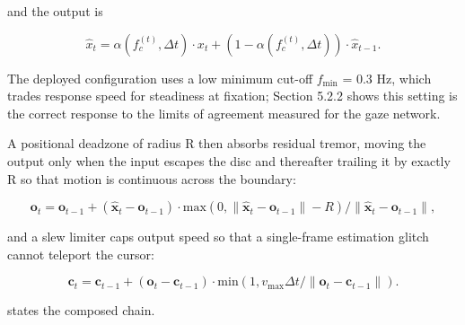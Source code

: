 and the output is

\begin{equation}
\label{eq:115}
\hat{x}_t = \alpha ( f_c^{(t)}, \Delta t ) \cdot x_t + ( 1 - \alpha ( f_c^{(t)}, \Delta t ) ) \cdot \hat{x}_{t-1}.
\end{equation}

The deployed configuration uses a low minimum cut-off $f_{\mathrm{min}}$ = 0.3 Hz, which trades response speed for steadiness at fixation; Section 5.2.2 shows this setting is the correct response to the limits of agreement measured for the gaze network.

A positional deadzone of radius R then absorbs residual tremor, moving the output only when the input escapes the disc and thereafter trailing it by exactly R so that motion is continuous across the boundary:

\begin{equation}
\label{eq:116}
\mathbf{o}_t = \mathbf{o}_{t-1} + ( \hat{\mathbf{x}}_t - \mathbf{o}_{t-1} ) \cdot \mathrm{max}( 0, \|\hat{\mathbf{x}}_t - \mathbf{o}_{t-1}\| - R ) / \|\hat{\mathbf{x}}_t - \mathbf{o}_{t-1}\| ,
\end{equation}

and a slew limiter caps output speed so that a single-frame estimation glitch cannot teleport the cursor:

\begin{equation}
\label{eq:117}
\mathbf{c}_t = \mathbf{c}_{t-1} + ( \mathbf{o}_t - \mathbf{c}_{t-1} ) \cdot \mathrm{min}( 1, v_{\mathrm{max}} \Delta t / \|\mathbf{o}_t - \mathbf{c}_{t-1}\| ) .
\end{equation}

 states the composed chain.

